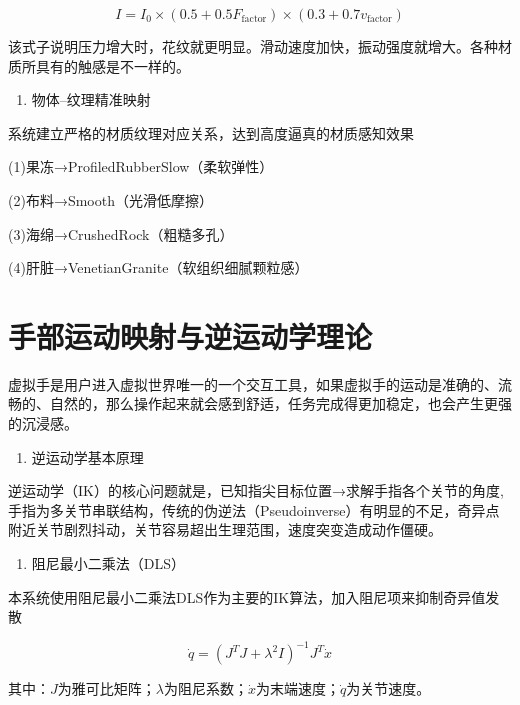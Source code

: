 \begin{equation}
I=I_0\times(0.5+0.5F_{\mathrm{factor}})\times(0.3+0.7v_{\mathrm{factor}})
\end{equation}

该式子说明压力增大时，花纹就更明显。滑动速度加快，振动强度就增大。各种材质所具有的触感是不一样的。

\begin{enumerate}
\def\labelenumi{\arabic{enumi}.}
\setcounter{enumi}{1}
\item
  物体--纹理精准映射
\end{enumerate}

系统建立严格的材质纹理对应关系，达到高度逼真的材质感知效果

(1)果冻→ProfiledRubberSlow（柔软弹性）

(2)布料→Smooth（光滑低摩擦）

(3)海绵→CrushedRock（粗糙多孔）

(4)肝脏→VenetianGranite（软组织细腻颗粒感）

\section{手部运动映射与逆运动学理论}

虚拟手是用户进入虚拟世界唯一的一个交互工具，如果虚拟手的运动是准确的、流畅的、自然的，那么操作起来就会感到舒适，任务完成得更加稳定，也会产生更强的沉浸感。

\begin{enumerate}
\def\labelenumi{\arabic{enumi}.}
\item
  逆运动学基本原理
\end{enumerate}

逆运动学（IK）的核心问题就是，已知指尖目标位置→求解手指各个关节的角度,手指为多关节串联结构，传统的伪逆法（Pseudoinverse）有明显的不足，奇异点附近关节剧烈抖动，关节容易超出生理范围，速度突变造成动作僵硬。

\begin{enumerate}
\def\labelenumi{\arabic{enumi}.}
\setcounter{enumi}{1}
\item
  阻尼最小二乘法（DLS）
\end{enumerate}

本系统使用阻尼最小二乘法DLS作为主要的IK算法，加入阻尼项来抑制奇异值发散

\begin{equation}
\dot{q}=(J^TJ+\lambda^2 I)^{-1}J^T\dot{x}
\end{equation}

其中：$J$为雅可比矩阵；$\lambda$为阻尼系数；$\dot{x}$为末端速度；$\dot{q}$为关节速度。

